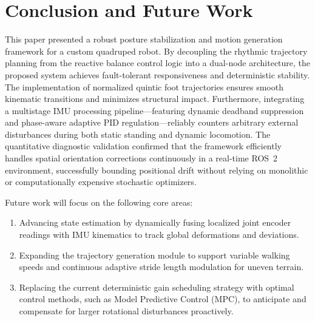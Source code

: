 \section{Conclusion and Future Work}

This paper presented a robust posture stabilization and motion generation framework for a custom quadruped robot. By decoupling the rhythmic trajectory planning from the reactive balance control logic into a dual-node architecture, the proposed system achieves fault-tolerant responsiveness and deterministic stability. The implementation of normalized quintic foot trajectories ensures smooth kinematic transitions and minimizes structural impact. Furthermore, integrating a multistage IMU processing pipeline—featuring dynamic deadband suppression and phase-aware adaptive PID regulation—reliably counters arbitrary external disturbances during both static standing and dynamic locomotion. The quantitative diagnostic validation confirmed that the framework efficiently handles spatial orientation corrections continuously in a real-time ROS~2 environment, successfully bounding positional drift without relying on monolithic or computationally expensive stochastic optimizers.

Future work will focus on the following core areas:
\begin{enumerate}
    \item Advancing state estimation by dynamically fusing localized joint encoder readings with IMU kinematics to track global deformations and deviations.
    \item Expanding the trajectory generation module to support variable walking speeds and continuous adaptive stride length modulation for uneven terrain.
    \item Replacing the current deterministic gain scheduling strategy with optimal control methods, such as Model Predictive Control (MPC), to anticipate and compensate for larger rotational disturbances proactively.
\end{enumerate}

